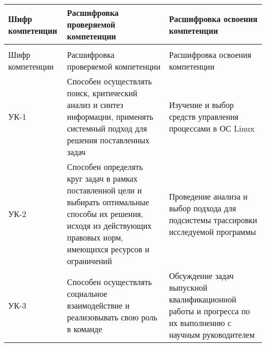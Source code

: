 {
\fontsize{12}{9}\selectfont
\vspace*{-12pt}
\noindent \begin{longtable}[c]{|p{2.2cm}|p{6.5cm}|p{6.5cm}|}
\hline
Шифр компетенции & Расшифровка проверяемой компетенции & Расшифровка освоения компетенции\\
\hline
\endfirsthead
\caption*{\raggedright\hspace{-10pt} Продолжение таблицы 1\vspace*{-35pt}}\\
\hline
Шифр компетенции & Расшифровка проверяемой компетенции & Расшифровка освоения компетенции\\
\hline
\endhead
УК-1 &
Способен осуществлять поиск, критический анализ и синтез информации, применять системный подход для решения поставленных задач &
Изучение и выбор средств управления процессами в ОС Linux
\\ \hline

УК-2 &
Способен определять круг задач в рамках поставленной цели и выбирать оптимальные способы их решения, исходя из действующих правовых норм, имеющихся ресурсов и ограничений &
Проведение анализа и выбор подхода для подсистемы трассировки исследуемой программы
\\ \hline

УК-3 &
Способен осуществлять социальное взаимодействие и реализовывать свою роль в команде &
Обсуждение задач выпускной квалификационной работы и прогресса по их выполнению с научным руководителем
\\ \hline


\end{longtable}}
